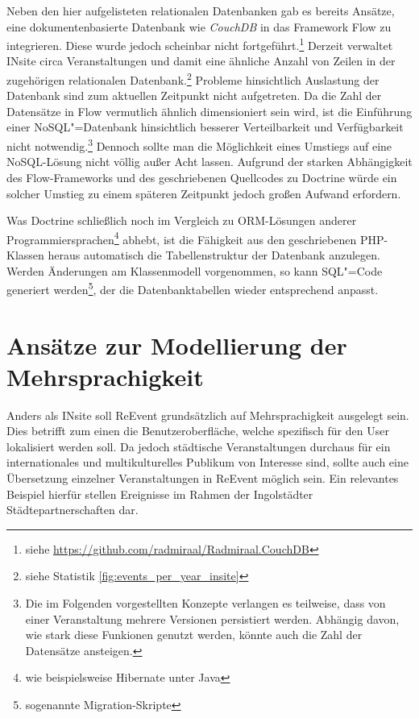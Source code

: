 Neben den hier aufgelisteten relationalen Datenbanken gab es bereits Ansätze, eine dokumentenbasierte Datenbank wie \emph{CouchDB} in das Framework Flow zu integrieren. Diese wurde jedoch scheinbar nicht fortgeführt.\footnote{siehe \url{https://github.com/radmiraal/Radmiraal.CouchDB}} Derzeit verwaltet INsite circa  Veranstaltungen und damit eine ähnliche Anzahl von Zeilen in der zugehörigen relationalen Datenbank.\footnote{siehe Statistik \ref{fig:events_per_year_insite}} Probleme hinsichtlich Auslastung der Datenbank sind zum aktuellen Zeitpunkt nicht aufgetreten. Da die Zahl der Datensätze in Flow vermutlich ähnlich dimensioniert sein wird, ist die Einführung einer NoSQL"=Datenbank hinsichtlich besserer Verteilbarkeit und Verfügbarkeit nicht notwendig.\footnote{Die im Folgenden vorgestellten Konzepte verlangen es teilweise, dass von einer Veranstaltung mehrere Versionen persistiert werden. Abhängig davon, wie stark diese Funkionen genutzt werden, könnte auch die Zahl der Datensätze ansteigen.} Dennoch sollte man die Möglichkeit eines Umstiegs auf eine NoSQL-Lösung nicht völlig außer Acht lassen. Aufgrund der starken Abhängigkeit des Flow-Frameworks und des geschriebenen Quellcodes zu Doctrine würde ein solcher Umstieg zu einem späteren Zeitpunkt jedoch großen Aufwand erfordern.

Was Doctrine schließlich noch im Vergleich zu ORM-Lösungen anderer Programmiersprachen\footnote{wie beispielsweise Hibernate unter Java} abhebt, ist die Fähigkeit aus den geschriebenen PHP-Klassen heraus automatisch die Tabellenstruktur der Datenbank anzulegen. Werden Änderungen am Klassenmodell vorgenommen, so kann SQL"=Code generiert werden\footnote{sogenannte Migration-Skripte}, der die Datenbanktabellen wieder entsprechend anpasst.

\section{Ansätze zur Modellierung der Mehrsprachigkeit}
\label{sec:ReEvent:MultiLanguage}

Anders als INsite soll ReEvent grundsätzlich auf Mehrsprachigkeit ausgelegt sein. Dies betrifft zum einen die Benutzeroberfläche, welche spezifisch für den User lokalisiert werden soll. Da jedoch städtische Veranstaltungen durchaus für ein internationales und multikulturelles Publikum von Interesse sind, sollte auch eine Übersetzung einzelner Veranstaltungen in ReEvent möglich sein. Ein relevantes Beispiel hierfür stellen Ereignisse im Rahmen der Ingolstädter Städtepartnerschaften dar.

